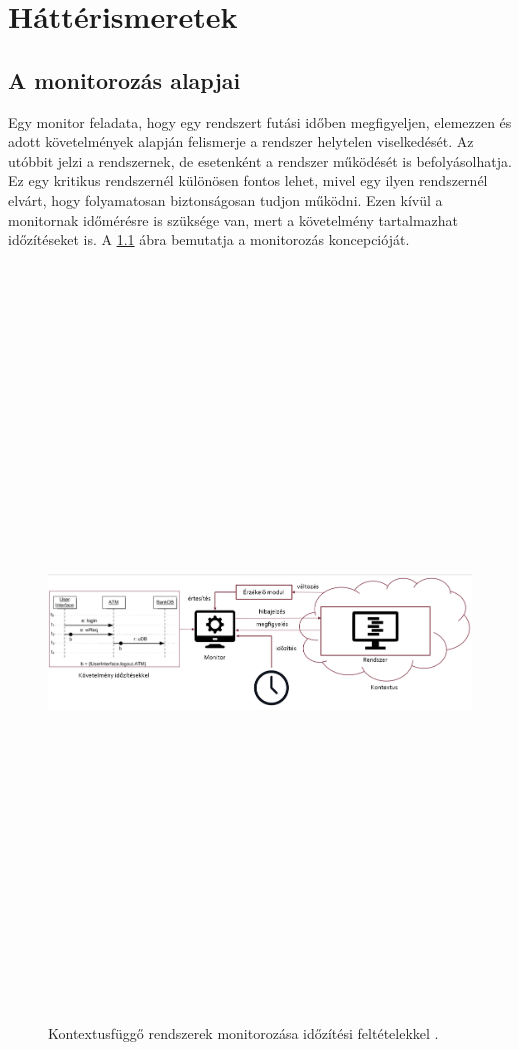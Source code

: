 \chapter{Háttérismeretek}\section{A monitorozás alapjai}

Egy monitor feladata, hogy egy rendszert futási időben megfigyeljen, elemezzen és adott követelmények alapján felismerje a rendszer helytelen viselkedését.
Az utóbbit jelzi a rendszernek, de esetenként a rendszer működését is befolyásolhatja.
Ez egy kritikus rendszernél különösen fontos lehet, mivel egy ilyen rendszernél elvárt, hogy folyamatosan biztonságosan tudjon működni.
Ezen kívül a monitornak időmérésre is szüksége van, mert a követelmény tartalmazhat időzítéseket is.
A \ref{introductory_figure} ábra bemutatja a monitorozás koncepcióját.

\begin{figure}[!ht]
    \includegraphics[width=150mm, height=20cm, keepaspectratio]{figures/introductory_figure.png}
    \caption{Kontextusfüggő rendszerek monitorozása időzítési feltételekkel \cite{Bakai}.}
    \label{introductory_figure}
\end{figure}

